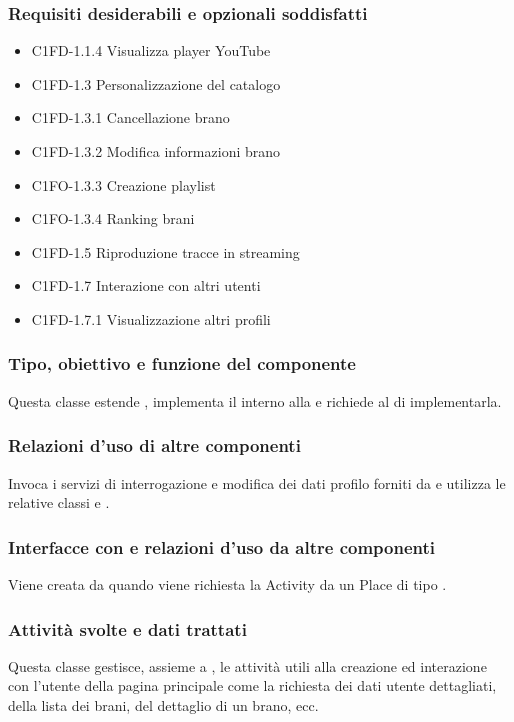 \subsubsection*{Requisiti desiderabili e opzionali soddisfatti}
\begin{itemize}
    \item C1FD-1.1.4 Visualizza player YouTube
    \item C1FD-1.3 Personalizzazione del catalogo 
    \item C1FD-1.3.1 Cancellazione brano
    \item C1FD-1.3.2 Modifica informazioni brano
    \item C1FO-1.3.3 Creazione playlist
    \item C1FO-1.3.4 Ranking brani
    \item C1FD-1.5 Riproduzione tracce in streaming
    \item C1FD-1.7 Interazione con altri utenti
    \item C1FD-1.7.1 Visualizzazione altri profili
\end{itemize}
\subsubsection*{Tipo, obiettivo e funzione del componente}
Questa classe estende , implementa il 
interno alla  e richiede al  di
implementarla.
\subsubsection*{Relazioni d'uso di altre componenti}
Invoca i servizi di interrogazione e modifica dei dati profilo forniti da
 e utilizza le relative classi  e
.
\subsubsection*{Interfacce con e relazioni d'uso da altre componenti}
Viene creata da  quando viene richiesta la Activity da
un Place di tipo .
\subsubsection*{Attivit\`a svolte e dati trattati}
Questa classe gestisce, assieme a , le attivit\`a utili alla
creazione ed interazione con l'utente della pagina principale come la
richiesta dei dati utente dettagliati, della lista dei brani, del dettaglio di
un brano, ecc.

